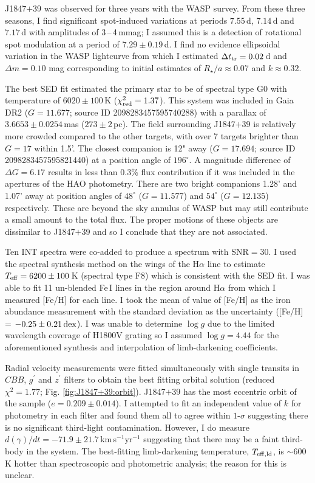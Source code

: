 J1847$+$39 was observed for three years with the WASP survey. From these three seasons, I find significant spot-induced variations at periods $7.55$\,d, $7.14$\,d and $7.17$\,d with amplitudes of  3\,--\,4\,mmag; I assumed this is a detection of rotational spot modulation at a period of $7.29\pm0.19$\,d. I find no evidence ellipsoidal variation in the WASP lightcurve from which I estimated $\Delta t_{\rm tr} = 0.02$\,d and $\Delta m = 0.10$ mag corresponding to initial estimates of $R_{\star}/a \approx 0.07$ and $k\approx0.32$.

The best SED fit estimated the primary star to be of spectral type G0 with temperature of $6020 \pm 100$\,K ($\chi_{\rm red}^2 = 1.37$). This system was included in Gaia DR2 ($G = 11.677$; source ID 2098283457595740288) with a parallax of $3.6653 \pm 0.0254$\,mas ($273 \pm 2$\,pc). The field surrounding J1847$+$39 is relatively more crowded compared to the other targets, with over 7 targets brighter than $G=17$ within 1.5'. The closest companion is 12" away ($G=17.694$; source ID 2098283457595821440) at a position angle of $196^\circ$. A magnitude difference of $\Delta G = 6.17$ results in less than 0.3\% flux contribution if it was included in the apertures of the HAO photometry. There are two bright companions 1.28' and 1.07' away at position angles of $48^\circ$ ($G = 11.577$) and $54^\circ$ ($G=12.135$) respectively. These are beyond the sky annulus of WASP but may still contribute a small amount to the total flux. The proper motions of these objects are dissimilar to J1847$+$39 and so I conclude that they are not associated.


 
Ten INT spectra were co-added to produce a spectrum with SNR$ = 30$. I used the spectral synthesis method on the wings of the  H$\alpha$ line to estimate $T_{\rm eff} = 6200 \pm 100$\,K (spectral type F8) which is consistent with the SED fit. I was able to fit 11 un-blended Fe\,I lines in the region around H$\alpha$ from which I measured [Fe/H] for each line. I took the mean of value of [Fe/H] as the iron abundance measurement with the standard deviation as the uncertainty ([Fe/H] = $-0.25 \pm 0.21\, \rm dex$). I was unable to determine $\log g$ due to the limited wavelength coverage of H1800V grating so I assumed $\log g = 4.44$ for the aforementioned synthesis and interpolation of limb-darkening coefficients.

Radial velocity measurements were fitted simultaneously with single transits in $CBB$, $g^{'}$ and $z^{'}$ filters to obtain the best fitting orbital solution (reduced $\chi^2 = 1.77$; Fig. \ref{fig:J1847+39:orbit}). J1847$+$39 has the most eccentric orbit of the sample ($e = 0.209 \pm 0.014$). I attempted to fit an independent value of $k$ for photometry in each filter and found them all to agree within $1$-$\sigma$ suggesting there is no significant third-light contamination. However, I do measure $d(\gamma)/dt = -71.9 \pm 21.7$\,km\,s$^{-1}$yr$^{-1}$ suggesting that there may be a faint third-body in the system. The best-fitting limb-darkening temperature, $T_{\rm eff,ld}$, is $\sim 600$\,K hotter than spectroscopic and photometric analysis; the reason for this is unclear.


